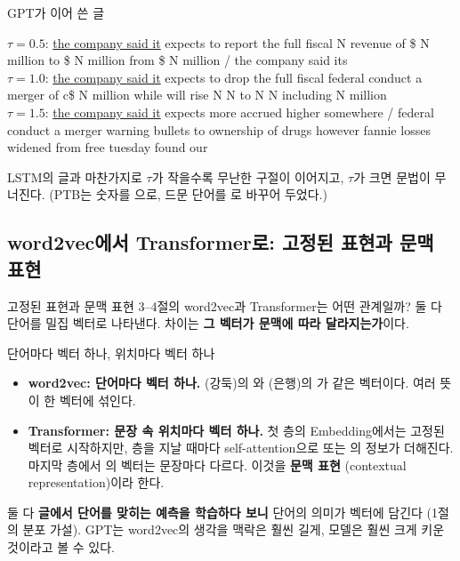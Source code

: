 \documentclass[aspectratio=169,11pt]{beamer}
\begin{document}
\begin{frame}{GPT가 이어 쓴 글}
\begin{remarkbox}
\ttfamily\footnotesize\raggedright
\textsf{$\tau=0.5$:} \underline{the company said it} expects to report the full fiscal N revenue
of \$ N million to \$ N million from \$ N million / the company said its\\[0.6em]
\textsf{$\tau=1.0$:} \underline{the company said it} expects to drop the full fiscal federal
conduct a merger of c\$ N million while will rise N N to N N including N million\\[0.6em]
\textsf{$\tau=1.5$:} \underline{the company said it} expects more accrued higher somewhere /
federal conduct a merger warning bullets to ownership of drugs however fannie losses widened
from free tuesday found our
\end{remarkbox}
\vskip2mm
LSTM의 글과 마찬가지로 $\tau$가 작을수록 무난한 구절이 이어지고, $\tau$가 크면 문법이 무너진다.
(PTB는 숫자를 으로, 드문 단어를 로 바꾸어 두었다.)
\end{frame}

\subsection{word2vec에서 Transformer로: 고정된 표현과 문맥 표현}

\begin{frame}{고정된 표현과 문맥 표현}
3--4절의 word2vec과 Transformer는 어떤 관계일까?
둘 다 단어를 밀집 벡터로 나타낸다.
차이는 \textbf{그 벡터가 문맥에 따라 달라지는가}이다.
\vskip2mm
\end{frame}

\begin{frame}{단어마다 벡터 하나, 위치마다 벡터 하나}
\begin{itemize}
\item \textbf{word2vec: 단어마다 벡터 하나.}
   (강둑)의 와  (은행)의 가 같은 벡터이다.
  여러 뜻이 한 벡터에 섞인다.
\item \textbf{Transformer: 문장 속 위치마다 벡터 하나.}
  첫 층의 Embedding에서는 고정된 벡터로 시작하지만, 층을 지날 때마다 self-attention으로
   또는 의 정보가 더해진다.
  마지막 층에서 의 벡터는 문장마다 다르다.
  이것을 \textbf{문맥 표현} (contextual representation)이라 한다.
\end{itemize}
\vskip3mm
\begin{keybox}[공통점]
둘 다 \textbf{글에서 단어를 맞히는 예측을 학습하다 보니} 단어의 의미가 벡터에 담긴다
(1절의 분포 가설).
GPT는 word2vec의 생각을 맥락은 훨씬 길게, 모델은 훨씬 크게 키운 것이라고 볼 수 있다.
\end{keybox}
\end{frame}
\end{document}
